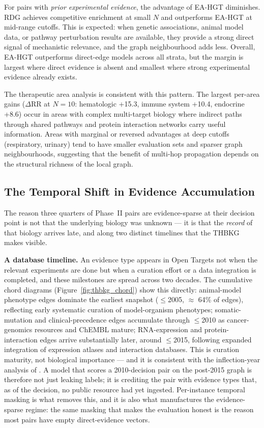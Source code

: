 \documentclass[a4,center]{NAR}
\newcommand{\eahgt}{\textsc{EA-HGT}}
\begin{document}
{For pairs with \emph{prior experimental evidence}, the advantage of
\eahgt{} diminishes. RDG achieves competitive enrichment at small $N$
and outperforms \eahgt{} at mid-range cutoffs. This is expected: when
genetic associations, animal
model data, or pathway perturbation results are available, they provide a
strong direct signal of mechanistic relevance, and the graph neighbourhood
adds less. Overall, \eahgt{} outperforms direct-edge models across all
strata, but the margin is largest where direct evidence is absent and
smallest where strong experimental evidence already exists.

The therapeutic area analysis is consistent with this pattern. The largest
per-area gains ($\Delta$RR at $N = 10$: hematologic +15.3, immune system
+10.4, endocrine +8.6) occur in areas with complex multi-target biology
where indirect paths through shared pathways and protein interaction
networks carry useful information. Areas with marginal or reversed
advantages at deep cutoffs (respiratory, urinary) tend to have smaller
evaluation sets and sparser graph neighbourhoods, suggesting that the
benefit of multi-hop propagation depends on the structural richness of
the local graph.


\subsection{The Temporal Shift in Evidence Accumulation}
\label{sec:discussion_temporal_shift}

The reason three quarters of Phase~II pairs are evidence-sparse at
their decision point is not that the underlying biology was unknown ---
it is that the \emph{record} of that biology arrives late, and along
two distinct timelines that the THBKG makes visible.

\textbf{A database timeline.} An evidence type appears in Open Targets
not when the relevant experiments are done but when a curation effort
or a data integration is completed, and these milestones are spread
across two decades. The cumulative chord diagrams
(Figure~\ref{fig:thbkg_chord}) show this directly: animal-model
phenotype edges dominate the earliest snapshot ($\leq$2005, $\approx$
64\% of edges), reflecting early systematic curation of model-organism
phenotypes; somatic-mutation and clinical-precedence edges accumulate
through $\leq$2010 as cancer-genomics resources and ChEMBL mature;
RNA-expression and protein-interaction edges arrive substantially
later, around $\leq$2015, following expanded integration of expression
atlases and interaction databases. This is curation maturity, not
biological importance --- and it is consistent with the inflection-year
analysis of \citet{Falaguera2025TemporalDiscovery}. A model that scores a
2010-decision pair on the post-2015 graph is therefore not just leaking
labels; it is crediting the pair with evidence types that, as of the
decision, no public resource had yet ingested. Per-instance temporal
masking is what removes this, and it is also what manufactures the
evidence-sparse regime: the same masking that makes the evaluation
honest is the reason most pairs have empty direct-evidence vectors.

}
\end{document}
